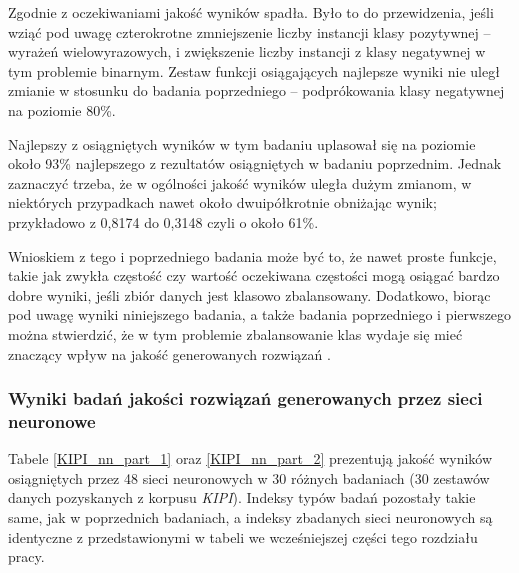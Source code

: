 Zgodnie z oczekiwaniami jakość wyników spadła.
Było to do przewidzenia, jeśli wziąć pod uwagę czterokrotne zmniejszenie liczby instancji klasy pozytywnej -- wyrażeń wielowyrazowych, i zwiększenie liczby instancji z klasy negatywnej w tym problemie binarnym. 
Zestaw funkcji osiągających najlepsze wyniki nie uległ zmianie w stosunku do badania poprzedniego -- podprókowania klasy negatywnej na poziomie 80\%.

\par
Najlepszy z osiągniętych wyników w tym badaniu uplasował się na poziomie około 93\% najlepszego z rezultatów osiągniętych w badaniu poprzednim.
Jednak zaznaczyć trzeba, że w ogólności jakość wyników uległa dużym zmianom, w niektórych przypadkach nawet około dwuipółkrotnie obniżając wynik; przykładowo z 0,8174 do 0,3148 czyli o około 61\%.

\par
Wnioskiem z tego i poprzedniego badania może być to, że nawet proste funkcje, takie jak zwykła częstość czy wartość oczekiwana częstości mogą osiągać bardzo dobre wyniki, jeśli zbiór danych jest klasowo zbalansowany.
Dodatkowo, biorąc pod uwagę wyniki niniejszego badania, a także badania poprzedniego i pierwszego można stwierdzić, że w tym problemie zbalansowanie klas wydaje się mieć znaczący wpływ na jakość generowanych rozwiązań .

\newpage

\subsubsection{Wyniki badań jakości rozwiązań generowanych przez sieci neuronowe}
Tabele \ref{KIPI_nn_part_1} oraz \ref{KIPI_nn_part_2} prezentują jakość wyników osiągniętych przez 48 sieci neuronowych w 30 różnych badaniach (30 zestawów danych pozyskanych z korpusu \emph{KIPI}).
Indeksy typów badań pozostały takie same, jak w poprzednich badaniach, a indeksy zbadanych sieci neuronowych są identyczne z przedstawionymi w tabeli we wcześniejszej części tego rozdziału pracy.

